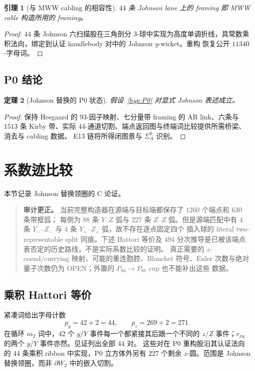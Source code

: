\documentclass[11pt]{amsart}
\newtheorem{theorem}{定理}[section]
\newtheorem{lemma}[theorem]{引理}
\theoremstyle{definition}
\theoremstyle{remark}
\begin{document}
\begin{lemma}[与 MWW cabling 的相容性]\label{lem:P0c}
$44$ 条 Johnson lane 上的 framing 即 MWW cable
构造所用的 framing。
\end{lemma}

\begin{proof}
$44$ 条 Johnson 六扫描股在三角剖分 $3$-球中实现为高度单调折线，具常数乘积法向，绑定到认证 handlebody 对中的 Johnson $y$-wicket。重构
恢复公开 $11340$-字母词。
\end{proof}

\subsection{P0 结论}\label{sec:p0-conclusion}

\begin{theorem}[Johnson 替换的 P0 状态]\label{thm:P0discharge}
假设~\ref{hyp:P0} 对显式 Johnson 表述成立。
\end{theorem}

\begin{proof}
保持 Heegaard 的 $93$-因子映射、七分量带 framing 的 AR link、六条与
$1513$ 条 Kirby 带、实际 $44$-通道切割、端点返回图与终端词比较提供所需桥梁、消去与 cabling 数据。
E13 链将所得闭图景与 $\Sigma_A^0$ 识别。
\end{proof}
\section{系数迹比较}\label{sec:c-comparison}

本节记录 Johnson 替换领圈的 C 论证。

\begin{quote}\small
\textbf{审计更正。}
当前完整构造器在源端与目标端都保存了 $1260$ 个端点和 $630$ 条带框弧；
每侧为 $88$ 条 $Y$--$Z$ 弧与 $227$ 条 $Z$--$Z$ 弧。但是源端匹配中有
$4$ 条 $Y_-$--$Z_-$ 与 $4$ 条 $Y_+$--$Z_+$ 弧，故不存在逐点固定四个
插入球的 literal two-representable split 同痕。下述 Hattori 等价及
$494$ 分次推导是已被该端点表否定的历史路线，不是实际系数比较的证明。
真正需要的 $z$-coend/currying 映射、可能的重连胞腔、Blanchet 符号、Euler
次数与绝对量子次数仍为 OPEN；外置的 $P_{86}\to P_{88}$ cup 也不能补出这些
数据。
\end{quote}

\subsection{乘积 Hattori 等价}

紧凑词给出字母计数
\[
p_y=42+2=44,\qquad p_z=269+2=271.
\]
在循环 $m_2$ 词中，42 个 $y/Y$ 事件每一个都紧接其后跟一个不同的 $z/Z$ 事件；$r_{xy}$ 的两个 $y/Y$ 事件亦然。见证列出全部 44 对。
这些对在 P0 重构股沿其认证法向的 44 条乘积 ribbon 中实现，P0 立方体外另有 $227$ 个剩余 $z$-圆。范围是 Johnson 替换领圈，而非 $\partial W_2$ 中的嵌入切割。
\end{document}
